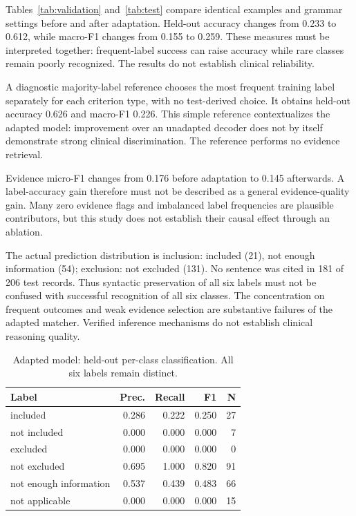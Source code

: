 Tables~\ref{tab:validation} and~\ref{tab:test} compare identical examples and grammar settings before and after adaptation. Held-out accuracy changes from 0.233 to 0.612, while macro-F1 changes from 0.155 to 0.259. These measures must be interpreted together: frequent-label success can raise accuracy while rare classes remain poorly recognized. The results do not establish clinical reliability.

A diagnostic majority-label reference chooses the most frequent training label separately for each criterion type, with no test-derived choice. It obtains held-out accuracy 0.626 and macro-F1 0.226. This simple reference contextualizes the adapted model: improvement over an unadapted decoder does not by itself demonstrate strong clinical discrimination. The reference performs no evidence retrieval.

Evidence micro-F1 changes from 0.176 before adaptation to 0.145 afterwards. A label-accuracy gain therefore must not be described as a general evidence-quality gain. Many zero evidence flags and imbalanced label frequencies are plausible contributors, but this study does not establish their causal effect through an ablation.

The actual prediction distribution is inclusion: included (21), not enough information (54); exclusion: not excluded (131). No sentence was cited in 181 of 206 test records. Thus syntactic preservation of all six labels must not be confused with successful recognition of all six classes. The concentration on frequent outcomes and weak evidence selection are substantive failures of the adapted matcher. Verified inference mechanisms do not establish clinical reasoning quality.

\begin{table}[t]\centering\scriptsize\caption{Adapted model: held-out per-class classification. All six labels remain distinct.}\label{tab:classes}\begin{tabular}{lrrrr}\toprule Label & Prec. & Recall & F1 & N\\\midrule

included & 0.286 & 0.222 & 0.250 & 27\\

not included & 0.000 & 0.000 & 0.000 & 7\\

excluded & 0.000 & 0.000 & 0.000 & 0\\

not excluded & 0.695 & 1.000 & 0.820 & 91\\

not enough information & 0.537 & 0.439 & 0.483 & 66\\

not applicable & 0.000 & 0.000 & 0.000 & 15\\

\bottomrule\end{tabular}\end{table}

